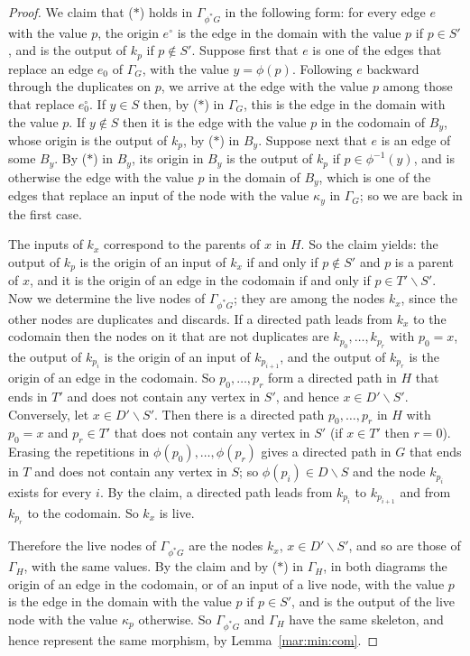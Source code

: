 \documentclass[12pt]{amsart}
\theoremstyle{plain}
\theoremstyle{definition}
\theoremstyle{remark}
\numberwithin{equation}{section}
\theoremstyle{plain}
\newcommand{\0}{\emptyset}
\newcommand{\mi}{\smallsetminus}
\begin{document}
\begin{proof}
We claim that ($*$) holds in $\Gamma_{\phi^* G}$ in the following form: for every edge $e$ with the value $p$, the origin $e^{\circ}$ is the edge in the domain with the value $p$ if $p \in S'$, and is the output of $k_p$ if $p \notin S'$. Suppose first that $e$ is one of the edges that replace an edge $e_0$ of $\Gamma_G$, with the value $y = \phi(p)$. Following $e$ backward through the duplicates on $p$, we arrive at the edge with the value $p$ among those that replace $e_0^{\circ}$. If $y \in S$ then, by ($*$) in $\Gamma_G$, this is the edge in the domain with the value $p$. If $y \notin S$ then it is the edge with the value $p$ in the codomain of $B_y$, whose origin is the output of $k_p$, by ($*$) in $B_y$. Suppose next that $e$ is an edge of some $B_y$. By ($*$) in $B_y$, its origin in $B_y$ is the output of $k_p$ if $p \in \phi^{-1}(y)$, and is otherwise the edge with the value $p$ in the domain of $B_y$, which is one of the edges that replace an input of the node with the value $\kappa_y$ in $\Gamma_G$; so we are back in the first case.

The inputs of $k_x$ correspond to the parents of $x$ in $H$. So the claim yields: the output of $k_p$ is the origin of an input of $k_x$ if and only if $p \notin S'$ and $p$ is a parent of $x$, and it is the origin of an edge in the codomain if and only if $p \in T' \mi S'$. Now we determine the live nodes of $\Gamma_{\phi^* G}$; they are among the nodes $k_x$, since the other nodes are duplicates and discards. If a directed path leads from $k_x$ to the codomain then the nodes on it that are not duplicates are $k_{p_0}, \ldots, k_{p_r}$ with $p_0 = x$, the output of $k_{p_i}$ is the origin of an input of $k_{p_{i+1}}$, and the output of $k_{p_r}$ is the origin of an edge in the codomain. So $p_0, \ldots, p_r$ form a directed path in $H$ that ends in $T'$ and does not contain any vertex in $S'$, and hence $x \in D' \mi S'$. Conversely, let $x \in D' \mi S'$. Then there is a directed path $p_0, \ldots, p_r$ in $H$ with $p_0 = x$ and $p_r \in T'$ that does not contain any vertex in $S'$ (if $x \in T'$ then $r = 0$). Erasing the repetitions in $\phi(p_0), \ldots, \phi(p_r)$ gives a directed path in $G$ that ends in $T$ and does not contain any vertex in $S$; so $\phi(p_i) \in D \mi S$ and the node $k_{p_i}$ exists for every $i$. By the claim, a directed path leads from $k_{p_i}$ to $k_{p_{i+1}}$ and from $k_{p_r}$ to the codomain. So $k_x$ is live.

Therefore the live nodes of $\Gamma_{\phi^* G}$ are the nodes $k_x$, $x \in D' \mi S'$, and so are those of $\Gamma_H$, with the same values. By the claim and by ($*$) in $\Gamma_H$, in both diagrams the origin of an edge in the codomain, or of an input of a live node, with the value $p$ is the edge in the domain with the value $p$ if $p \in S'$, and is the output of the live node with the value $\kappa_p$ otherwise. So $\Gamma_{\phi^* G}$ and $\Gamma_H$ have the same skeleton, and hence represent the same morphism, by Lemma~\ref{mar:min:com}.
\end{proof}
\end{document}
